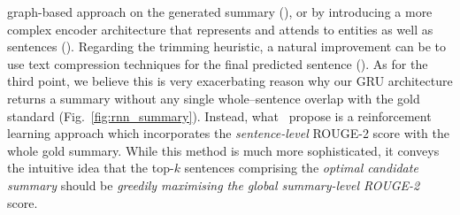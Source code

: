 \begin{itemize}
        graph-based approach on the generated summary (\cite{sonawane2016coreference}), or by introducing a more complex
        encoder architecture that represents and attends to entities as well as sentences (\cite{Huang2021ExtractiveSC}).
        Regarding the trimming heuristic, a natural improvement can be to use text compression techniques for the final predicted sentence (\cite{ghalandari2022efficient, KNIGHT200291}).
        As for the third point, we believe this is very exacerbating reason why our GRU architecture returns a summary
        without any single whole--sentence overlap with the gold standard (Fig.~\ref{fig:rnn_summary}).
        Instead, what~\cite{zmandar-etal-2021-joint} propose is a reinforcement learning approach which incorporates
        the \emph{sentence-level} ROUGE-2 score with the whole gold summary.
        While this method is much more sophisticated, it conveys the intuitive idea that the top-$k$ sentences comprising the
        \emph{optimal candidate summary} should be \emph{greedily maximising the global summary-level ROUGE-2} score.
\end{itemize}


